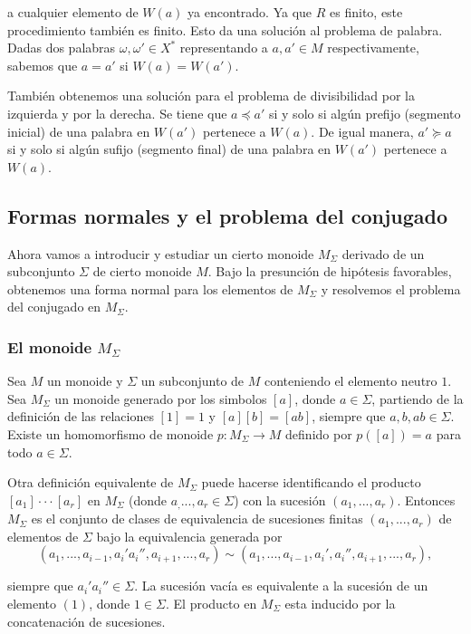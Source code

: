 \documentclass[12pt]{article}
\theoremstyle{definition}
\begin{document}
a cualquier elemento de $W(a)$ ya encontrado. Ya que $R$ es finito, este procedimiento también es finito. Esto da una solución al problema de palabra. Dadas dos palabras $\omega,\omega'\in X^*$ representando a $a,a'\in M$ respectivamente, sabemos que $a=a'$ si $W(a)=W(a')$.

También obtenemos una solución para el problema de divisibilidad por la izquierda y por la derecha. Se tiene que $a\preceq a'$ si y solo si algún prefijo (segmento inicial) de una palabra en $W(a')$ pertenece a $W(a)$. De igual manera, $a'\succeq a$ si y solo si algún sufijo (segmento final) de una palabra en $W(a')$ pertenece a $W(a)$.

\subsection{Formas normales y el problema del conjugado}

Ahora vamos a introducir y estudiar un cierto monoide $M_\Sigma$ derivado de un subconjunto $\Sigma$ de cierto monoide $M$. Bajo la presunción de hipótesis favorables, obtenemos una forma normal para los elementos de $M_\Sigma$ y resolvemos el problema del conjugado en $M_\Sigma$.

\subsubsection{El monoide $M_\Sigma$} 

Sea $M$ un monoide y $\Sigma$ un subconjunto de $M$ conteniendo el elemento neutro $1$. Sea $M_\Sigma$ un monoide generado por los simbolos $[a]$, donde $a\in \Sigma$, partiendo de la definición de las relaciones $[1]=1$ y $[a][b]=[ab]$, siempre que $a,b,ab\in\Sigma$. Existe un homomorfismo de monoide $p:M_\Sigma\rightarrow M$ definido por $p([a])=a$ para todo $a\in\Sigma$.

Otra definición equivalente de $M_\Sigma$ puede hacerse identificando el producto $[a_1]\cdot\cdot\cdot[a_r]$ en $M_\Sigma$ (donde $a_,...,a_r\in \Sigma$) con la sucesión $(a_1,...,a_r)$. Entonces $M_\Sigma$ es el conjunto de clases de equivalencia de sucesiones finitas $(a_1,...,a_r)$ de elementos de $\Sigma$ bajo la equivalencia generada por
$$(a_1,...,a_{i-1}, a_i'a_i'',a_{i+1},...,a_r)\sim (a_1,...,a_{i-1}, a_i',a_i'',a_{i+1},...,a_r),$$

siempre que $a_i'a_i''\in\Sigma$. La sucesión vacía es equivalente a la sucesión de un elemento $(1)$, donde $1\in\Sigma$. El producto en $M_\Sigma$ esta inducido por la concatenación de sucesiones.
\end{document}
